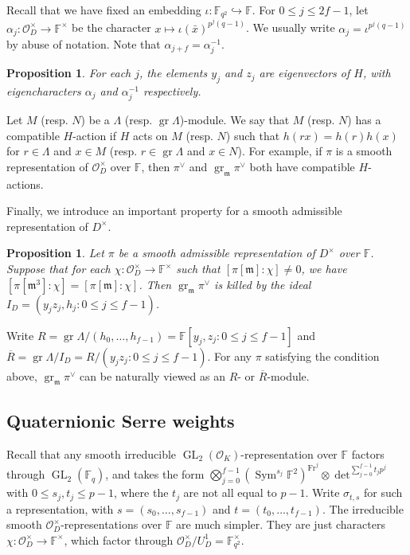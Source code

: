 \documentclass{article}
\newtheorem{proposition}[definition]{Proposition}
\numberwithin{equation}{section}
\DeclareMathOperator{\GL}{GL}
\DeclareMathOperator{\Fr}{Fr}
\DeclareMathOperator{\gr}{gr}
\DeclareMathOperator{\Sym}{Sym}
\newcommand{\fm}{\mathfrak{m}}
\newcommand{\bF}{\mathbb{F}}
\newcommand{\cO}{\mathcal{O}}
\begin{document}
Recall that we have fixed an embedding $\iota:\bF_{q^2}\hookrightarrow \bF$. 
For $0\leq j\leq 2f-1$, let $\alpha_j:\cO_D^\times\to \bF^\times$ be the character $x\mapsto\iota(\bar{x})^{p^j(q-1)}$. 
We usually write $\alpha_j=\iota^{p^j(q-1)}$ by abuse of notation. Note that $\alpha_{j+f}=\alpha_j^{-1}$. 


\begin{proposition}
    For each $j$, the elements $y_j$ and $z_j$ are eigenvectors of $H$, with eigencharacters $\alpha_j$ and $\alpha_j^{-1}$ respectively. 
\end{proposition}

Let $M$ (resp. $N$) be a $\Lambda$ (resp. $\gr \Lambda$)-module. We say that $M$ (resp. $N$) has a compatible $H$-action if $H$ acts on $M$ (resp. $N$) such that 
$h(rx)=h(r)h(x)$ for $r\in \Lambda$ and $x\in M$ (resp. $r\in \gr \Lambda$ and $x\in N$). 
For example, if $\pi$ is a smooth representation of $\cO_D^\times$ over $\bF$, 
then $\pi^\vee$ and $\gr_\fm\pi^\vee$ both have compatible $H$-actions. 

Finally, we introduce an important property for a smooth admissible representation of $D^\times$. 

\begin{proposition}\label{killed-by-I_D}
    Let $\pi$ be a smooth admissible representation of $D^\times$ over $\bF$. 
    Suppose that for each $\chi:\cO_D^\times\to\bF^\times$ such that $[\pi[\fm]:\chi]\ne 0$, 
    we have $[\pi[\fm^3]:\chi]=[\pi[\fm]:\chi]$. Then $\gr_\fm\pi^\vee$ is killed by the ideal 
    $I_D=(y_jz_j,h_j:0\leq j\leq f-1)$. 
\end{proposition}

Write $R=\gr \Lambda/(h_0,\ldots,h_{f-1})=\bF[y_j,z_j:0\leq j\leq f-1]$ and $\overline{R}=\gr \Lambda/I_D=R/(y_jz_j:0\leq j\leq f-1)$. 
For any $\pi$ satisfying the condition above, 
$\gr_\fm\pi^\vee$ can be naturally viewed as an $R$- or $\overline{R}$-module. 

\subsection{Quaternionic Serre weights}\label{quat-serre-weight}

Recall that any smooth irreducible $\GL_2(\cO_K)$-representation over $\bF$ factors through $\GL_2(\bF_q)$, and takes the form 
$\bigotimes_{j=0}^{f-1}(\Sym^{s_j}\bF^2)^{\Fr^j}\otimes\det^{\sum_{j=0}^{f-1}t_jp^j}$ 
with $0\leq s_j,t_j\leq p-1$, where the $t_j$ are not all equal to $p-1$. 
Write $\sigma_{t,s}$ for such a representation, with $s=(s_0,\ldots,s_{f-1})$ and $t=(t_0,\ldots,t_{f-1})$. 
The irreducible smooth $\cO_D^\times$-representations over $\bF$ are much simpler. 
They are just characters $\chi:\cO_D^\times\to\bF^\times$, which factor through $\cO_D^\times/U_D^1=\bF_{q^2}^\times$. 
\end{document}

